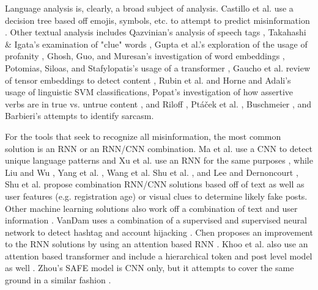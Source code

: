\documentclass[preprint,review,12pt]{elsarticle}
\begin{document}
Language analysis is, clearly, a broad subject of analysis.  Castillo et al. use a decision tree based off emojis, symbols, etc. to attempt to predict misinformation \cite{castillo2011information}. Other textual analysis includes Qazvinian's analysis of speech tags \cite{qazvinian2011rumor}, Takahashi \& Igata's examination of "clue" words \cite{takahashi2012rumor}, Gupta et al.'s exploration of the usage of profanity \cite{gupta2014tweetcred}, Ghosh, Guo, and Muresan's investigation of word embeddings \cite{ghosh2015sarcastic}, Potomias, Siloas, and Stafylopatis's usage of a transformer \cite{potamias2020transformer}, Gaucho et al. review of tensor embeddings to detect content \cite{guacho2018semi}, Rubin et al. \cite{rubin2016fake} and Horne and Adali's \cite{horne2017just} usage of linguistic SVM classifications, Popat's investigation of how assertive verbs are in true vs. untrue content \cite{popat2017assessing}, and Riloff \cite{riloff2013sarcasm}, Pt{\'a}{\v{c}}ek et al. \cite{ptavcek2014sarcasm}, Buschmeier \cite{buschmeier2014impact}, and Barbieri's \cite{barbieri2014modelling} attempts to identify sarcasm.



For the tools that seek to recognize all misinformation, the most common solution is an RNN or an RNN/CNN combination. Ma et al. use a CNN to detect unique language patterns \cite{ma2018rumor} and Xu et al. use an RNN for the same purposes \cite{xu2019deep}, while Liu and Wu \cite{liu2018early}, Yang et al. \cite{yang2012automatic}, Wang et al. \cite{wang2018eann} Shu et al. \cite{shu2019role}, and Lee and Dernoncourt \cite{lee2016sequential}, Shu et al. \cite{shu2019beyond,shu2020leveraging} propose combination RNN/CNN solutions based off of text as well as user features (e.g. registration age) or visual clues to determine likely fake posts.  Other machine learning solutions also work off a combination of text and user information \cite{sun2013detecting,kwon2017rumor,ma2015detect,ma2016detecting,zhao2015enquiring}. VanDam uses a combination of a supervised and supervised neural network to detect hashtag and account hijacking \cite{vandam2019learning}. Chen proposes an improvement to the RNN solutions by using an attention based RNN \cite{chen2018call}. Khoo et al. also use an attention based transformer and include a hierarchical token and post level model as well \cite{khoo2020interpretable}. Zhou's SAFE model is CNN only, but it attempts to cover the same ground in a similar fashion \cite{zhou2020mathsf}.
\end{document}

